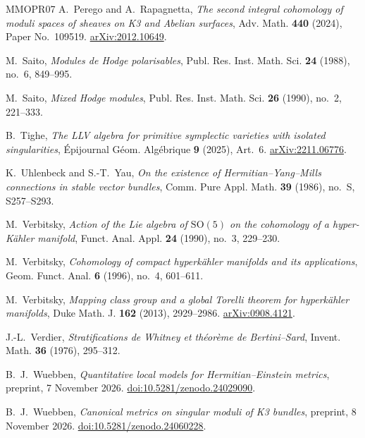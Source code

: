 \begin{thebibliography}{MMOPR07}
A.~Perego and A.~Rapagnetta,
\emph{The second integral cohomology of moduli spaces of sheaves on K3
and Abelian surfaces}, Adv. Math. \textbf{440} (2024), Paper
No.~109519.
\href{https://arxiv.org/abs/2012.10649}{arXiv:2012.10649}.

M.~Saito, \emph{Modules de Hodge polarisables},
Publ. Res. Inst. Math. Sci. \textbf{24} (1988), no.~6, 849--995.

M.~Saito, \emph{Mixed Hodge modules},
Publ. Res. Inst. Math. Sci. \textbf{26} (1990), no.~2, 221--333.

B.~Tighe, \emph{The LLV algebra for primitive symplectic varieties
with isolated singularities},
\'Epijournal G\'eom. Alg\'ebrique \textbf{9} (2025), Art.~6.
\href{https://arxiv.org/abs/2211.06776}{arXiv:2211.06776}.

K.~Uhlenbeck and S.-T.~Yau,
\emph{On the existence of Hermitian--Yang--Mills connections in stable
vector bundles}, Comm. Pure Appl. Math. \textbf{39} (1986), no.~S,
S257--S293.

M.~Verbitsky, \emph{Action of the Lie algebra of $\mathrm{SO}(5)$ on
the cohomology of a hyper-K\"ahler manifold},
Funct. Anal. Appl. \textbf{24} (1990), no.~3, 229--230.

M.~Verbitsky, \emph{Cohomology of compact hyperk\"ahler manifolds and
its applications}, Geom. Funct. Anal. \textbf{6} (1996), no.~4,
601--611.

M.~Verbitsky, \emph{Mapping class group and a global Torelli theorem
for hyperk\"ahler manifolds}, Duke Math. J. \textbf{162} (2013),
2929--2986.
\href{https://arxiv.org/abs/0908.4121}{arXiv:0908.4121}.

J.-L.~Verdier, \emph{Stratifications de Whitney et th\'eor\`eme de
Bertini--Sard}, Invent. Math. \textbf{36} (1976), 295--312.

B.~J.~Wuebben, \emph{Quantitative local models for
Hermitian--Einstein metrics}, preprint, 7 November 2026.
\href{https://doi.org/10.5281/zenodo.24029090}{doi:10.5281/zenodo.24029090}.

B.~J.~Wuebben, \emph{Canonical metrics on singular moduli of K3
bundles}, preprint, 8 November 2026.
\href{https://doi.org/10.5281/zenodo.24060228}{doi:10.5281/zenodo.24060228}.

\end{thebibliography}
